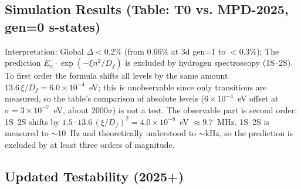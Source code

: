 	\subsection{Simulation Results (Table: T0 vs. MPD-2025, gen=0 s-states)}
	
	\begin{table}[ht]
		\centering
	\end{table}
	
	Interpretation: Global $\Delta<$0.2\% (from 0.66\% at 3d gen=1 to $<$0.3\%); The prediction $E_n \cdot \exp(-\xi n^2/D_f)$ is excluded by hydrogen spectroscopy (1S--2S). To first order the formula shifts all levels by the same amount $13.6\,\xi/D_f = 6.0\times10^{-4}$~eV; this is unobservable since only transitions are measured, so the table's comparison of absolute levels ($6\times10^{-4}$~eV offset at $\sigma = 3\times10^{-7}$~eV, about 2000$\sigma$) is not a test. The observable part is second order: 1S--2S shifts by $1.5 \cdot 13.6\,(\xi/D_f)^2 = 4.0\times10^{-8}$~eV $\approx 9.7$~MHz. 1S--2S is measured to $\sim$10~Hz and theoretically understood to $\sim$kHz, so the prediction is excluded by at least three orders of magnitude.
	
	\subsection{Updated Testability (2025+)}
	
